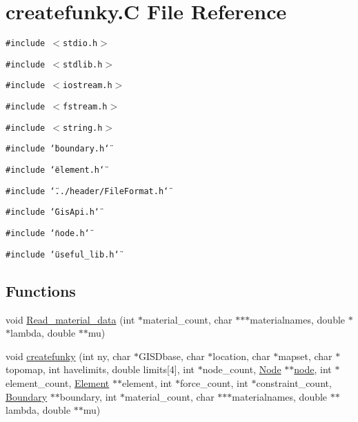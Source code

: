 \hypertarget{createfunky_8C}{
\section{createfunky.C File Reference}
\label{createfunky_8C}
}
{\tt \#include $<$stdio.h$>$}\par
{\tt \#include $<$stdlib.h$>$}\par
{\tt \#include $<$iostream.h$>$}\par
{\tt \#include $<$fstream.h$>$}\par
{\tt \#include $<$string.h$>$}\par
{\tt \#include \char`\"{}boundary.h\char`\"{}}\par
{\tt \#include \char`\"{}element.h\char`\"{}}\par
{\tt \#include \char`\"{}../header/File\-Format.h\char`\"{}}\par
{\tt \#include \char`\"{}Gis\-Api.h\char`\"{}}\par
{\tt \#include \char`\"{}node.h\char`\"{}}\par
{\tt \#include \char`\"{}useful\_\-lib.h\char`\"{}}\par
\subsection*{Functions}
\begin{CompactItemize}
\item 
void \hyperlink{createfunky_8C_a0}{Read\_\-material\_\-data} (int $\ast$material\_\-count, char $\ast$$\ast$$\ast$materialnames, double $\ast$$\ast$lambda, double $\ast$$\ast$mu)
\item 
void \hyperlink{createfunky_8C_a1}{createfunky} (int ny, char $\ast$GISDbase, char $\ast$location, char $\ast$mapset, char $\ast$topomap, int havelimits, double limits\mbox{[}4\mbox{]}, int $\ast$node\_\-count, \hyperlink{classNode}{Node} $\ast$$\ast$\hyperlink{structnode}{node}, int $\ast$element\_\-count, \hyperlink{classElement}{Element} $\ast$$\ast$element, int $\ast$force\_\-count, int $\ast$constraint\_\-count, \hyperlink{classBoundary}{Boundary} $\ast$$\ast$boundary, int $\ast$material\_\-count, char $\ast$$\ast$$\ast$materialnames, double $\ast$$\ast$lambda, double $\ast$$\ast$mu)
\end{CompactItemize}


